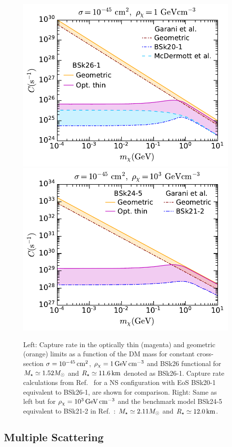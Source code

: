 \begin{figure}
    \centering
    \includegraphics[width=.495\textwidth]{capture_1/capture_rate_n0_comp1.pdf}
    \includegraphics[width=.495\textwidth]{capture_1/capture_rate_n0_comp2.pdf}    
    \caption{Left: Capture rate in the optically thin  (magenta) and geometric (orange) limits as a function of the DM mass for constant cross-section $\sigma=10^{-45}{\rm \,cm}^2$, $\rho_\chi=1{\rm \,GeV}{\rm \,cm}^{-3}$ and BSk26 functional for $M_\star\simeq1.52M_\odot$ and $R_\star\simeq11.6{\rm \,km}$ denoted as BSk26-1. Capture rate calculations from Ref.~\cite{Garani:2018kkd_may_NewAnalysisNeutron} for a NS configuration with EoS BSk20-1~\cite{Potekhin:2013qqa_Analyticalrepresentationsunified} equivalent to BSk26-1, are shown for comparison. Right: Same as left but for $\rho_\chi=10^3{\rm \,GeV}{\rm \,cm}^{-3}$ and the benchmark model BSk24-5 equivalent to BSk21-2 in Ref.~\cite{Garani:2018kkd_may_NewAnalysisNeutron}: $M_\star\simeq2.11M_\odot$ and $R_\star\simeq12.0{\rm \,km}$. 
    }
    \label{ch3:fig:Cratecomp}
\end{figure}

\subsection{Multiple Scattering}
\label{sec:largemassandsigma}


